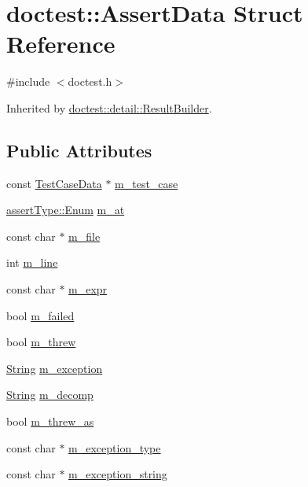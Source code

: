 \hypertarget{structdoctest_1_1_assert_data}{}\section{doctest\+:\+:Assert\+Data Struct Reference}
\label{structdoctest_1_1_assert_data}


{\ttfamily \#include $<$doctest.\+h$>$}



Inherited by \mbox{\hyperlink{structdoctest_1_1detail_1_1_result_builder}{doctest\+::detail\+::\+Result\+Builder}}.

\subsection*{Public Attributes}
\begin{DoxyCompactItemize}
\item 
const \mbox{\hyperlink{structdoctest_1_1_test_case_data}{Test\+Case\+Data}} $\ast$ \mbox{\hyperlink{structdoctest_1_1_assert_data_ab26ee6e05feaefc982c4f5481458cbda}{m\+\_\+test\+\_\+case}}
\item 
\mbox{\hyperlink{namespacedoctest_1_1assert_type_ae1bb5bed722f34f1c38b83cb19d326d3}{assert\+Type\+::\+Enum}} \mbox{\hyperlink{structdoctest_1_1_assert_data_a0b3b2866b13ba048c0beea51bd798749}{m\+\_\+at}}
\item 
const char $\ast$ \mbox{\hyperlink{structdoctest_1_1_assert_data_ac22c9ed0d8c6edec58c4b26a0a00e714}{m\+\_\+file}}
\item 
int \mbox{\hyperlink{structdoctest_1_1_assert_data_a1142f5fb5d171964b7677a9d23f81548}{m\+\_\+line}}
\item 
const char $\ast$ \mbox{\hyperlink{structdoctest_1_1_assert_data_af8fe9e24ffba3f575c7384a85f96297a}{m\+\_\+expr}}
\item 
bool \mbox{\hyperlink{structdoctest_1_1_assert_data_ac9ddaf3e6532fdadba3c1f74eb931d4a}{m\+\_\+failed}}
\item 
bool \mbox{\hyperlink{structdoctest_1_1_assert_data_a3e9d4c7eeff7c4fe310b0597bf7027b8}{m\+\_\+threw}}
\item 
\mbox{\hyperlink{classdoctest_1_1_string}{String}} \mbox{\hyperlink{structdoctest_1_1_assert_data_a1fdbef933ef26c0bc174f9ec716924cd}{m\+\_\+exception}}
\item 
\mbox{\hyperlink{classdoctest_1_1_string}{String}} \mbox{\hyperlink{structdoctest_1_1_assert_data_a1c6b5804b7dd4d8ba70126cb598f30bd}{m\+\_\+decomp}}
\item 
bool \mbox{\hyperlink{structdoctest_1_1_assert_data_ace744d365532d299052c8a80a63f7079}{m\+\_\+threw\+\_\+as}}
\item 
const char $\ast$ \mbox{\hyperlink{structdoctest_1_1_assert_data_a1c476dc606780aefdb7db2d7ca146199}{m\+\_\+exception\+\_\+type}}
\item 
const char $\ast$ \mbox{\hyperlink{structdoctest_1_1_assert_data_aa01e5c79855d78e3612b6d77a0fef54b}{m\+\_\+exception\+\_\+string}}
\end{DoxyCompactItemize}


